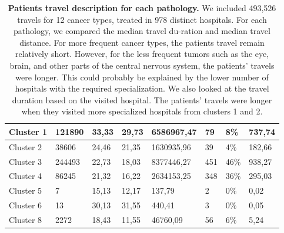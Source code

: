 \begin{table}[H]
{\begin{tabular}{|l|l|l|l|l|l|l|l|}
            Cluster 1 & 121890 & 33,33 & 29,73 & 6586967,47 & 79 & 8\% & 737,74 \\ \hline
            Cluster 2 & 38606 & 24,46 & 21,35 & 1630935,96 & 39 & 4\% & 182,66 \\ \hline
            Cluster 3 & 244493 & 22,73 & 18,03 & 8377446,27 & 451 & 46\% & 938,27 \\ \hline
            Cluster 4 & 86245 & 21,32 & 16,22 & 2634153,25 & 348 & 36\% & 295,03 \\ \hline
            Cluster 5 & 7 & 15,13 & 12,17 & 137,79 & 2 & 0\% & 0,02 \\ \hline
            Cluster 6 & 13 & 30,13 & 31,55 & 440,41 & 3 & 0\% & 0,05 \\ \hline
            Cluster 8 & 2272 & 18,43 & 11,55 & 46760,09 & 56 & 6\% & 5,24 \\ \hline
        \end{tabular}
    }
    \caption{
        \textbf{Patients travel description for each pathology.} We included 493,526 travels for 12 cancer types, treated in 978 distinct hospitals. For each pathology, we compared the median travel du-ration and median travel distance. For more frequent cancer types, the patients travel remain relatively short. However, for the less frequent tumors such as the eye, brain, and other parts of the central nervous system, the patients' travels were longer. This could probably be explained by the lower number of hospitals with the required specialization. We also looked at the travel duration based on the visited hospital. The patients' travels were longer when they visited more specialized hospitals from clusters 1 and 2.
    }
    \label{table:distance_and_co2}
\end{table}

